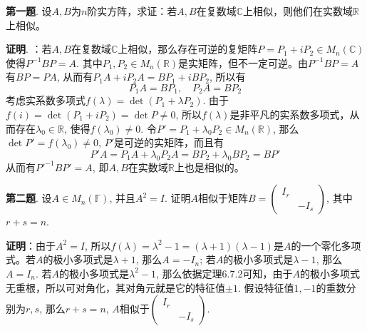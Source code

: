
\renewcommand{\newpageorvspace}{\vspace{2em}}

\date{2022-3-25  第二次习题课}



\maketitle


{\bf 第一题}. 设$A,B$为$n$阶实方阵，求证：若$A,B$在复数域$\mathbb{C}$上相似，则他们在实数域$\mathbb{R}$上相似。

{\bf 证明}. ：若$A,B$在复数域$\mathbb{C}$上相似，那么存在可逆的复矩阵$P = P_1 + i P_2 \in M_n(\mathbb{C})$ 使得$P^{-1}BP = A$. 其中$P_1, P_2 \in M_n(\mathbb{R})$是实矩阵，但不一定可逆。由$P^{-1}BP = A$有$BP = PA$, 从而有$P_1A + i P_2A = BP_1 + i BP_2$, 所以有
$$P_1A = BP_1, \quad P_2A = BP_2$$
考虑实系数多项式$f(\lambda) = \det (P_1 + \lambda P_2)$. 由于$f(i) = \det (P_1 + i P_2) = \det P \neq 0$, 所以$f(\lambda)$是非平凡的实系数多项式，从而存在$\lambda_0 \in \mathbb{R}$, 使得$f(\lambda_0) \neq 0$. 令$P' = P_1 + \lambda_0 P_2 \in M_n(\mathbb{R})$, 那么$\det P' = f(\lambda_0) \neq 0$, $P'$是可逆的实矩阵，而且有
$$P'A = P_1A + \lambda_0 P_2A = BP_2 + \lambda_0 BP_2 = BP'$$
从而有$P'^{-1}BP' = A$, 即$A,B$在实数域$\mathbb{R}$上也是相似的。


\newpageorvspace


{\bf 第二题}. 设$A \in M_n (\mathbb{F})$, 并且$A^2 = I$. 证明$A$相似于矩阵$B = \begin{pmatrix} I_r & \\ & -I_s \end{pmatrix}$, 其中$r+s=n$.

{\bf 证明}：由于$A^2 = I$, 所以$f(\lambda) = \lambda^2 - 1 = (\lambda + 1) (\lambda - 1)$是$A$的一个零化多项式。若$A$的极小多项式是$\lambda + 1$, 那么$A = -I_n$; 若$A$的极小多项式是$\lambda - 1$, 那么$A = I_n$. 若$A$的极小多项式是$\lambda^2 - 1$, 那么依据定理6.7.2可知，由于$A$的极小多项式无重根，所以可对角化，其对角元就是它的特征值$\pm 1$. 假设特征值$1, -1$的重数分别为$r,s$, 那么$r+s = n$, $A$相似于$\begin{pmatrix} I_r & \\ & -I_s \end{pmatrix}$.

